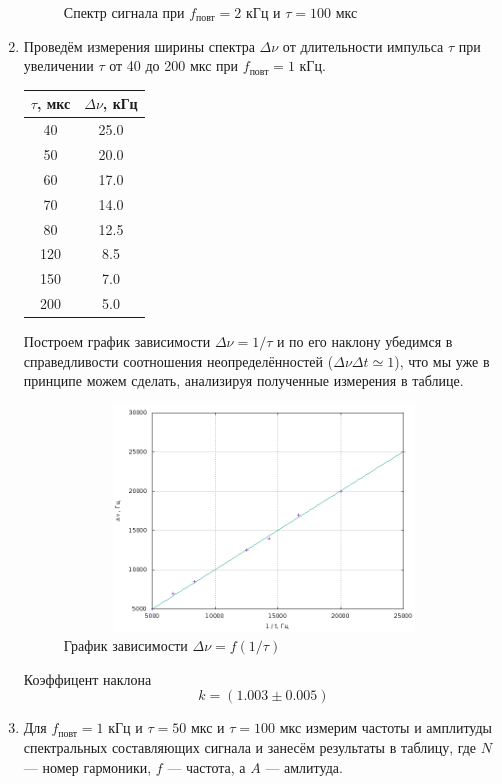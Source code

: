 \documentclass[12pt]{article}
\begin{document}
\begin{enumerate}
\begin{figure}[h!]
			\caption{Спектр сигнала при $f_\text{повт} = 2$ кГц и $\tau = 100$ мкс}			
		\end{figure}
	\item
		Проведём измерения ширины спектра $\Delta \nu$ от длительности импульса $\tau$ при увеличении $\tau$ от 40 до 200 мкс при $f_\text{повт} = 1$ кГц.
		\begin{table}[h!]
			\centering
			\begin{tabular}{|c|c|}
			\hline
				$\tau$, мкс & $\Delta \nu$, кГц \\
			\hline
				40 & 25.0 \\
			\hline
				50 & 20.0 \\
			\hline
				60 & 17.0 \\
			\hline
				70 & 14.0 \\
			\hline
				80 & 12.5 \\
			\hline
				120 & 8.5 \\
			\hline
				150 & 7.0 \\
			\hline
				200 & 5.0 \\
			\hline
			\end{tabular}
		\end{table}
	\par
		Построем график зависимости $\Delta \nu = 1 / \tau$ и по его наклону убедимся в справедливости соотношения неопределённостей ($\Delta \nu \Delta t \simeq 1$), что мы уже в принципе можем сделать, анализируя полученные измерения в таблице.
	\begin{figure}[h!]
		\centering
		\includegraphics[width = 11cm, height = 6cm]{plot1.png}
		\caption{График зависимости $\Delta \nu = f(1 / \tau)$}
	\end{figure}	
	\par
		Коэффицент наклона		
	\[
		k = \left(1.003 \pm 0.005\right)
	\]
	\item
		Для $f_\text{повт} = 1$ кГц и $\tau = 50$ мкс и $\tau = 100$ мкс измерим частоты и амплитуды спектральных составляющих сигнала и занесём результаты в таблицу, где $N$ --- номер гармоники, $f$ --- частота, а $A$ --- амлитуда.

\end{enumerate}
\end{document}
